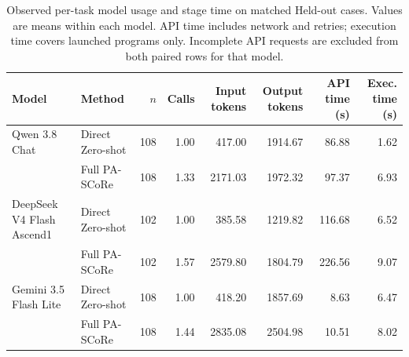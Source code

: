 \documentclass{article}
\begin{document}
\begin{table}[t]
\centering
\caption{Observed per-task model usage and stage time on matched Held-out cases. Values are means within each model. API time includes network and retries; execution time covers launched programs only. Incomplete API requests are excluded from both paired rows for that model.}
\label{tab:cost}
\small
\begin{tabular}{llrrrrrr}
\toprule
Model & Method & $n$ & Calls & Input tokens & Output tokens & API time (s) & Exec. time (s) \\
\midrule
Qwen 3.8 Chat & Direct Zero-shot & 108 & 1.00 & 417.00 & 1914.67 & 86.88 & 1.62 \\
 & Full PA-SCoRe & 108 & 1.33 & 2171.03 & 1972.32 & 97.37 & 6.93 \\
\midrule
DeepSeek V4 Flash Ascend1 & Direct Zero-shot & 102 & 1.00 & 385.58 & 1219.82 & 116.68 & 6.52 \\
 & Full PA-SCoRe & 102 & 1.57 & 2579.80 & 1804.79 & 226.56 & 9.07 \\
\midrule
Gemini 3.5 Flash Lite & Direct Zero-shot & 108 & 1.00 & 418.20 & 1857.69 & 8.63 & 6.47 \\
 & Full PA-SCoRe & 108 & 1.44 & 2835.08 & 2504.98 & 10.51 & 8.02 \\
\bottomrule
\end{tabular}
\end{table}
\end{document}
